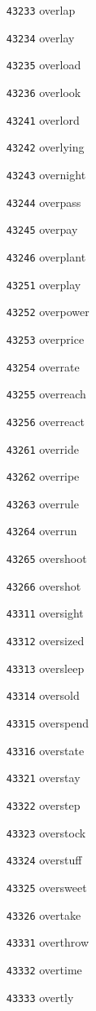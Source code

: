 \documentclass[twoside,11pt]{article}
\begin{document}
\begin{multicols}{5}
\begin{enumerate}
\item[\texttt{43233}] overlap
\item[\texttt{43234}] overlay
\item[\texttt{43235}] overload
\item[\texttt{43236}] overlook
\item[\texttt{43241}] overlord
\item[\texttt{43242}] overlying
\item[\texttt{43243}] overnight
\item[\texttt{43244}] overpass
\item[\texttt{43245}] overpay
\item[\texttt{43246}] overplant
\item[\texttt{43251}] overplay
\item[\texttt{43252}] overpower
\item[\texttt{43253}] overprice
\item[\texttt{43254}] overrate
\item[\texttt{43255}] overreach
\item[\texttt{43256}] overreact
\item[\texttt{43261}] override
\item[\texttt{43262}] overripe
\item[\texttt{43263}] overrule
\item[\texttt{43264}] overrun
\item[\texttt{43265}] overshoot
\item[\texttt{43266}] overshot
\item[\texttt{43311}] oversight
\item[\texttt{43312}] oversized
\item[\texttt{43313}] oversleep
\item[\texttt{43314}] oversold
\item[\texttt{43315}] overspend
\item[\texttt{43316}] overstate
\item[\texttt{43321}] overstay
\item[\texttt{43322}] overstep
\item[\texttt{43323}] overstock
\item[\texttt{43324}] overstuff
\item[\texttt{43325}] oversweet
\item[\texttt{43326}] overtake
\item[\texttt{43331}] overthrow
\item[\texttt{43332}] overtime
\item[\texttt{43333}] overtly

\end{enumerate}
\end{multicols}
\end{document}
